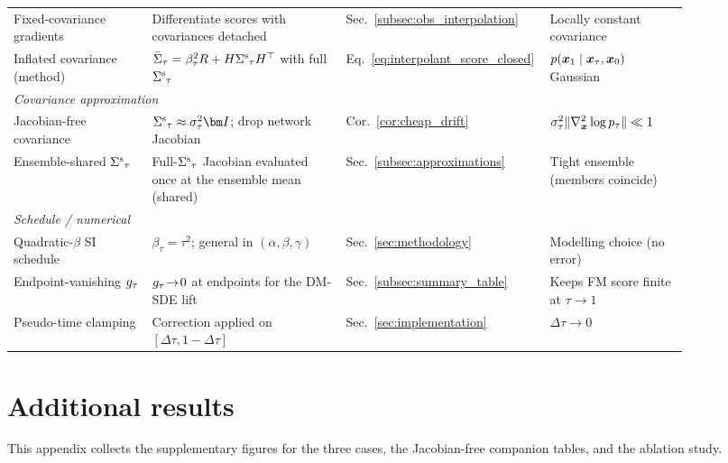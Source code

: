 \begin{table}[ht]
\begin{tabular}{p{0.20\linewidth} p{0.29\linewidth} p{0.18\linewidth} p{0.20\linewidth}}
        Fixed-covariance gradients & Differentiate scores with covariances detached & Sec.~\ref{subsec:obs_interpolation} & Locally constant covariance \\
        Inflated covariance (method) & $\bar\Sigma_\tau=\beta_\tau^2R+H{\Sigma^{\mathrm{s}}}_\tau H^\top$ with full ${\Sigma^{\mathrm{s}}}_\tau$ & Eq.~\eqref{eq:interpolant_score_closed} & $p(\boldsymbol{x}_1\mid\boldsymbol{x}_\tau,\boldsymbol{x}_0)$ Gaussian \\
        \midrule
        \multicolumn{4}{l}{\emph{Covariance approximation}}\\
        Jacobian-free covariance & $\srccov_\tau\approx\sigpath_\tau^2\bI$; drop network Jacobian & Cor.~\ref{cor:cheap_drift} & $\sigma_\tau^2\|\nabla^2_{\boldsymbol{x}}\log p_\tau\|\ll1$ \\
        Ensemble-shared ${\Sigma^{\mathrm{s}}}_\tau$ & Full-${\Sigma^{\mathrm{s}}}_\tau$ Jacobian evaluated once at the ensemble mean (shared) & Sec.~\ref{subsec:approximations} & Tight ensemble (members coincide) \\
        \midrule
        \multicolumn{4}{l}{\emph{Schedule / numerical}}\\
        Quadratic-$\beta$ SI schedule & $\beta_\tau=\tau^2$; general in $(\alpha,\beta,\gamma)$ & Sec.~\ref{sec:methodology} & Modelling choice (no error) \\
        Endpoint-vanishing $g_\tau$ & $g_\tau\!\to\!0$ at endpoints for the DM-SDE lift & Sec.~\ref{subsec:summary_table} & Keeps FM score finite at $\tau\to1$ \\
        Pseudo-time clamping & Correction applied on $[\Delta\tau,1-\Delta\tau]$ & Sec.~\ref{sec:implementation} & $\Delta\tau\to0$ \\
        \bottomrule
    \end{tabular}
\end{table}

\section{Additional results}\label{appendix:additional_results}

This appendix collects the supplementary figures for the three cases, the Jacobian-free companion tables, and the ablation study.

